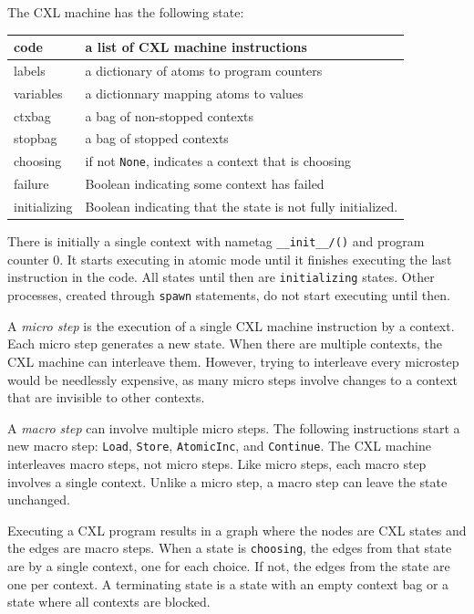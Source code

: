 \documentclass{report}
\begin{document}
The CXL machine has the following state:

\vspace{1em}
\begin{tabular}{|l|l|}
\hline
code & a list of CXL machine instructions \\
\hline
labels & a dictionary of atoms to program counters \\
\hline
variables & a dictionnary mapping atoms to values \\
\hline
ctxbag & a bag of non-stopped contexts \\
\hline
stopbag & a bag of stopped contexts \\
\hline
choosing & if not \texttt{None}, indicates a context that is choosing \\
\hline
failure & Boolean indicating some context has failed \\
\hline
initializing & Boolean indicating that the state is not fully initialized. \\
\hline
\end{tabular}
\vspace{1em}

There is initially a single context with nametag
\texttt{\_\_init\_\_/()} and program counter 0.  It starts executing
in atomic mode until it finishes executing the last instruction in
the code.  All states until then are \texttt{initializing} states.
Other processes, created through \texttt{spawn} statements, do not
start executing until then.

A \emph{micro step} is the execution of a single CXL machine instruction
by a context.
Each micro step generates a new state.
When there are multiple contexts, the CXL machine can interleave them.
However, trying to interleave every microstep would be needlessly expensive,
as many micro steps involve changes to a context that are invisible to
other contexts.

A \emph{macro step} can involve multiple micro steps.  The following
instructions start a new macro step: \texttt{Load}, \texttt{Store},
\texttt{AtomicInc}, and \texttt{Continue}.  The CXL machine
interleaves macro steps, not micro steps.  Like micro steps, each
macro step involves a single context.  Unlike a micro step, a macro
step can leave the state unchanged.

Executing a CXL program results in a graph where the nodes are CXL
states and the edges are macro steps.
When a state is \texttt{choosing}, the edges from that state are
by a single context, one for each choice.  If not, the edges from
the state are one per context.
A terminating state is a state with an empty context bag or a state
where all contexts are blocked.
\end{document}
